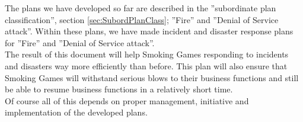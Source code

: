 The plans we have developed so far are described in the ”subordinate plan classification”, section \ref{sec:SubordPlanClass}; ”Fire” and ”Denial of Service attack”. Within these plans, we have made incident and disaster response plans for ”Fire” and ”Denial of Service attack”.\\
The result of this document will help Smoking Games responding to incidents and disasters way more efficiently than before. This plan will also ensure that Smoking Games will withstand serious blows to their business functions and still be able to resume business functions in a relatively short time.\\
Of course all of this depends on proper management, initiative and implementation of the developed plans.\\